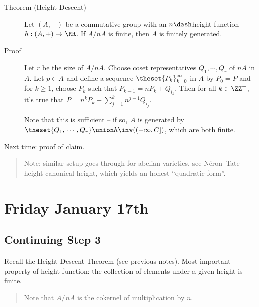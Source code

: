 \begin{description}
\item[Theorem (Height Descent)]
Let \((A, +)\) be a commutative group with an \(n\dash\)height function
\(h: (A, +) \to \RR\). If \(A/nA\) is finite, then \(A\) is finitely
generated.
\item[Proof]
Let \(r\) be the size of \(A/nA\). Choose coset representatives
\(Q_1, \cdots, Q_r\) of \(nA\) in \(A\). Let \(p\in A\) and define a
sequence \(\theset{P_k}_{k=0}^\infty\) in \(A\) by \(P_0 = P\) and for
\(k\geq 1\), choose \(P_k\) such that \(P_{k-1} = nP_k + Q_{i_k}\). Then
for all \(k\in \ZZ^+\), it's true that
\(P = n^k P_k + \sum_{j=1}^k n^{j-1} Q_{i_j}\).


Note that this is sufficient -- if so, \(A\) is generated by
\(\theset{Q_1, \cdots, Q_r} \union h\inv((-\infty, C])\), which are both
finite.
\end{description}

Next time: proof of claim.

\begin{quote}
Note: similar setup goes through for abelian varieties, see Néron--Tate
height canonical height, which yields an honest ``quadratic form''.
\end{quote}

\hypertarget{friday-january-17th}{%
\section{Friday January 17th}\label{friday-january-17th}}

\hypertarget{continuing-step-3}{%
\subsection{Continuing Step 3}\label{continuing-step-3}}

Recall the Height Descent Theorem (see previous notes). Most important
property of height function: the collection of elements under a given
height is finite.

\begin{quote}
Note that \(A/nA\) is the cokernel of multiplication by \(n\).
\end{quote}


